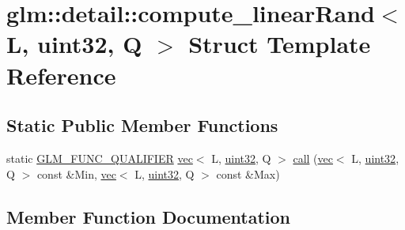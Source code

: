 \hypertarget{structglm_1_1detail_1_1compute__linear_rand_3_01_l_00_01uint32_00_01_q_01_4}{}\section{glm\+:\+:detail\+:\+:compute\+\_\+linear\+Rand$<$ L, uint32, Q $>$ Struct Template Reference}
\label{structglm_1_1detail_1_1compute__linear_rand_3_01_l_00_01uint32_00_01_q_01_4}
\subsection*{Static Public Member Functions}
\begin{DoxyCompactItemize}
\item 
static \mbox{\hyperlink{setup_8hpp_a33fdea6f91c5f834105f7415e2a64407}{G\+L\+M\+\_\+\+F\+U\+N\+C\+\_\+\+Q\+U\+A\+L\+I\+F\+I\+ER}} \mbox{\hyperlink{structglm_1_1vec}{vec}}$<$ L, \mbox{\hyperlink{namespaceglm_1_1detail_ade6cfbf377022aaa391af8cd50489222}{uint32}}, Q $>$ \mbox{\hyperlink{structglm_1_1detail_1_1compute__linear_rand_3_01_l_00_01uint32_00_01_q_01_4_a1375d1a35189e6e1689b6290aa25c17b}{call}} (\mbox{\hyperlink{structglm_1_1vec}{vec}}$<$ L, \mbox{\hyperlink{namespaceglm_1_1detail_ade6cfbf377022aaa391af8cd50489222}{uint32}}, Q $>$ const \&Min, \mbox{\hyperlink{structglm_1_1vec}{vec}}$<$ L, \mbox{\hyperlink{namespaceglm_1_1detail_ade6cfbf377022aaa391af8cd50489222}{uint32}}, Q $>$ const \&Max)
\end{DoxyCompactItemize}


\subsection{Member Function Documentation}
\mbox{\label{structglm_1_1detail_1_1compute__linear_rand_3_01_l_00_01uint32_00_01_q_01_4_a1375d1a35189e6e1689b6290aa25c17b}} 
